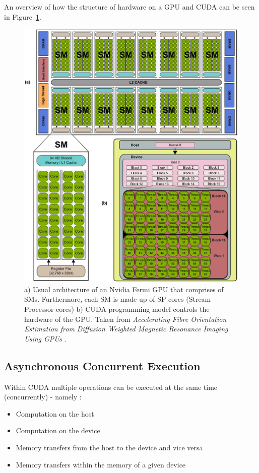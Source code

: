 \par An overview of how the structure of hardware on a GPU and CUDA can be seen in Figure~\ref{Figure:Nvidia-GPU-structure-CUDA-thread-structure}.

\begin{figure}[ht!]
	\centering
	\includegraphics[width=\textwidth, keepaspectratio]{images/ch1/nvidia_gpu_sms_cuda.png}
	\caption{a) Usual architecture of an Nvidia Fermi GPU that comprises of SMs. Furthermore, each SM is made up of SP cores (Stream Processor cores) b) CUDA programming model controls the hardware of the GPU. Taken from \emph{Accelerating Fibre Orientation Estimation from Diffusion Weighted Magnetic Resonance Imaging Using GPUs} \cite{Hernandez2013429}.}
	\label{Figure:Nvidia-GPU-structure-CUDA-thread-structure}
\end{figure}

\subsection{Asynchronous Concurrent Execution}\label{Subsection:theory-CUDA-asynchronous-concurrent-execution}
Within CUDA multiple operations can be executed at the same time (concurrently) - namely \cite{NVIDIAMay2022}:
\begin{itemize}
	\item Computation on the host
	\item Computation on the device
	\item Memory transfers from the host to the device and vice versa
	\item Memory transfers within the memory of a given device
\end{itemize}

